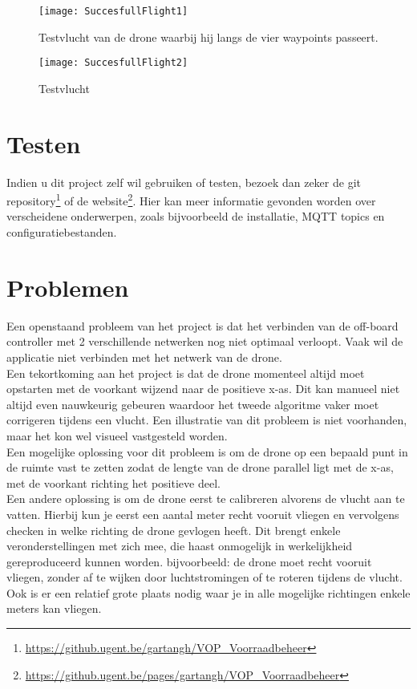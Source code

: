 \begin{figure}[p]	
	\centering
	\texttt{[image: SuccesfullFlight1]}
	\caption[Testvlucht 1]{Testvlucht van de drone waarbij hij langs de vier waypoints passeert.}
	\label{fig:SuccesfullFlight1}
\end{figure}
	
\begin{figure}[p]
	\centering
	\texttt{[image: SuccesfullFlight2]}
	\caption[Testvlucht 2]{Testvlucht}
	\label{fig:SuccesfullFlight2}
\end{figure}

\section{Testen} \label{sec:test}
Indien u dit project zelf wil gebruiken of testen, bezoek dan zeker de git repository\footnote{\url{https://github.ugent.be/gartangh/VOP_Voorraadbeheer}} of de website\footnote{\url{https://github.ugent.be/pages/gartangh/VOP_Voorraadbeheer}}.
Hier kan meer informatie gevonden worden over verscheidene onderwerpen, zoals bijvoorbeeld de installatie, MQTT topics en configuratiebestanden.

\section{Problemen} \label{sec:problems}
Een openstaand probleem van het project is dat het verbinden van de off-board controller met 2 verschillende netwerken nog niet optimaal verloopt. Vaak wil de applicatie niet verbinden met het netwerk van de drone.\\

Een tekortkoming aan het project is dat de drone momenteel altijd moet opstarten met de voorkant wijzend naar de positieve x-as.
Dit kan manueel niet altijd even nauwkeurig gebeuren waardoor het tweede algoritme vaker moet corrigeren tijdens een vlucht.
Een illustratie van dit probleem is niet voorhanden, maar het kon wel visueel vastgesteld worden.\\
Een mogelijke oplossing voor dit probleem is om de drone op een bepaald punt in de ruimte vast te zetten zodat de lengte van de drone parallel ligt met de x-as, met de voorkant richting het positieve deel.\\
Een andere oplossing is om de drone eerst te calibreren alvorens de vlucht aan te vatten.
Hierbij kun je eerst een aantal meter recht vooruit vliegen en vervolgens checken in welke richting de drone gevlogen heeft.
Dit brengt enkele veronderstellingen met zich mee, die haast onmogelijk in werkelijkheid gereproduceerd kunnen worden.
bijvoorbeeld: de drone moet recht vooruit vliegen, zonder af te wijken door luchtstromingen of te roteren tijdens de vlucht.
Ook is er een relatief grote plaats nodig waar je in alle mogelijke richtingen enkele meters kan vliegen.\\

